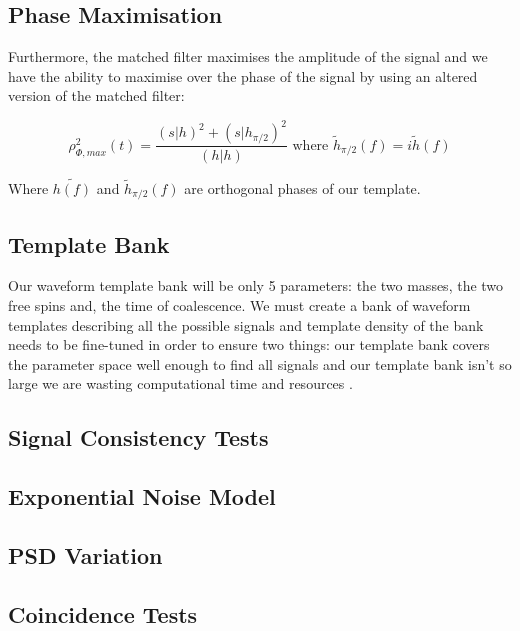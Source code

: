 \subsection{\label{2:sec:phase-maximisation}Phase Maximisation}

Furthermore, the matched filter maximises the amplitude of the \gw signal and we have the ability to maximise over the phase of the signal by using an altered version of the matched filter:

\begin{equation}
   \text{$\rho^2_{\Phi,max}(t) = \frac{(s|h)^2 + (s|h_{\pi/2})^2}{(h|h)}$ where $\tilde{h}_{\pi/2}(f) = i \tilde{h}(f)$}
   \label{2:eqn:phase_mf}
\end{equation}

Where $\tilde{h(f)}$ and $\tilde{h}_{\pi/2}(f)$ are orthogonal phases of our template.

\subsection{\label{2:sec:template-bank}Template Bank}

Our waveform template bank will be only 5 parameters: the two masses, the two free spins and, the time of coalescence. We must create a bank of waveform templates describing all the possible signals and template density of the bank needs to be fine-tuned in order to ensure two things: our template bank covers the parameter space well enough to find all signals and our template bank isn't so large we are wasting computational time and resources \cite{Owen_Sathya:1999}.

\subsection{\label{2:sec:signal-consistency}Signal Consistency Tests}

\subsection{\label{2:sec:template-fits}Exponential Noise Model}

\subsection{\label{2:sec:psd-var}PSD Variation}

\subsection{\label{2:sec:coincidence-test}Coincidence Tests}

